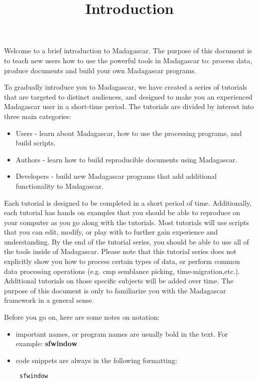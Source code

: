 \title{Introduction}
Welcome to a brief introduction to Madagascar.  The purpose of this document is to teach new users how to use the powerful tools in Madagascar to: process data, produce documents and build your own Madagascar programs. 

To gradually introduce you to Madagascar, we have created a series of tutorials that are targeted to distinct audiences, and designed to make you an experienced Madagascar user in a short-time period.  The tutorials are divided by interest into three main categories:
\begin{itemize}
    \item Users - learn about Madagascar, how to use the processing programs, and build scripts.
    \item Authors - learn how to build reproducible documents using Madagascar.
    \item Developers - build new Madagascar programs that add additional functionality to Madagascar.
\end{itemize}

Each tutorial is designed to be completed in a short period of time.  Additionally, each tutorial has hands on examples that you should be able to reproduce on your computer as you go along with the tutorials.  Most tutorials will use scripts that you can edit, modify, or play with to further gain experience and understanding.  By the end of the tutorial series, you should be able to use all of the tools inside of Madagascar.  Please note that this tutorial series does not explicitly show you how to process certain types of data, or perform common data processing operations (e.g. cmp semblance picking, time-migration,etc.).  Additional tutorials on those specific subjects will be added over time.  The purpose of this document is only to familiarize you with the Madagascar framework in a general sense.

Before you go on, here are some notes on notation:
\begin{itemize}
    \item important names, or program names are usually bold in the text.  For example: \textbf{sfwindow}
    \item code snippets are always in the following formatting: \begin{verbatim} sfwindow \end{verbatim}
\end{itemize}
